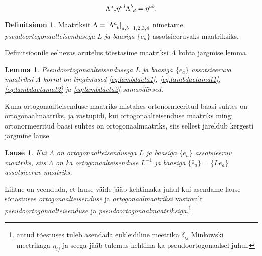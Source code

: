 \documentclass[a4paper,12pt]{article}
\theoremstyle{plain}
\newtheorem{lemma}{Lemma}[section]
\newtheorem{lause}{Lause}[section]
\theoremstyle{definition}
\newtheorem{definitsioon}{Definitsioon}[section]
\numberwithin{equation}{section}
\begin{document}
\begin{equation} \label{eq:lambdaeta2}
\Lambda\indices{^a_c} \eta^{cd} \Lambda\indices{^b_d} = \eta^{ab}.
\end{equation}
\begin{definitsioon}
Maatriksit $\Lambda = \left[\Lambda\indices{^a_b} \right]_{a,b=1,2,3,4}$ nimetame \emph{pseudoortogonaalteisendusega $L$ ja baasiga $\{e_a\}$} assotsieeruvaks maatriksiks.
\end{definitsioon}
Definitsioonile eelnevas arutelus tõestasime maatriksi $\Lambda$ kohta järgmise lemma.
\begin{lemma} \label{lemma:lambdainvariant}
Pseudoortogonaalteisendusega $L$ ja baasiga $\{e_a\}$ assotsieeruva maatriksi $\Lambda$ korral on tingimused \ref{eq:lambdaeta1}, \ref{eq:lambdaetamat1}, \ref{eq:lambdaetamat2} ja \ref{eq:lambdaeta2} samaväärsed.
\end{lemma}

Kuna ortogonaalteisenduse maatriks mistahes ortonormeeritud baasi suhtes on ortogonaalmaatriks, ja vastupidi, kui ortogonaalteisenduse maatriks mingi ortonormeeritud baasi suhtes on ortogonaalmaatriks, siis sellest järeldub kergesti järgmine lause.

\begin{lause}\textnormal{\cite[lk 271]{Kilp}}
Kui $\Lambda$ on ortogonaalteisendusega $L$ ja baasiga $\{e_a\}$ assotsieeruv maatriks, siis $\Lambda$ on ka ortogonaalteisenduse $L^{-1}$ ja baasiga $\{\hat{e}_a\} = \{Le_a\}$ assotsieeruv maatriks.
\end{lause}

Lihtne on veenduda, et lause väide jääb kehtimaka juhul kui asendame lause sõnastuses \emph{ortogonaalteisenduse} ja \emph{ortogonaalmaatriksi} vastavalt \emph{pseudoortogonaalteisenduse} ja \emph{pseudoortogonaalmaatriksiga}.\footnote{\cite{Kilp} antud tõestuses tuleb asendada eukleidiline meetrika $\delta_{ij}$ Minkowski meetrikaga $\eta_{ij}$ ja seega jääb tulemus kehtima ka pseudoortogonaalsel juhul.}
\end{document}

